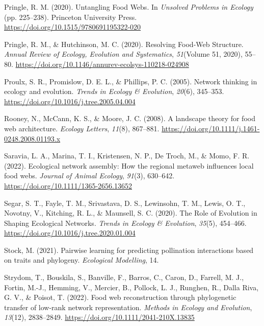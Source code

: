 \documentclass[
]{article}
\newlength{\cslhangindent}
\newenvironment{CSLReferences}[2] %
 {\begin{list}{}{%
  \setlength{\itemindent}{0pt}
  \setlength{\leftmargin}{0pt}
  \setlength{\parsep}{0pt}
  \ifodd #1
   \setlength{\leftmargin}{\cslhangindent}
   \setlength{\itemindent}{-1\cslhangindent}
  \fi
  \setlength{\itemsep}{#2\baselineskip}}}
 {\end{list}}
\begin{document}
\begin{CSLReferences}{1}{0}
Pringle, R. M. (2020). Untangling {Food Webs}. In \emph{Unsolved
{Problems} in {Ecology}} (pp. 225--238). Princeton University Press.
\url{https://doi.org/10.1515/9780691195322-020}

Pringle, R. M., \& Hutchinson, M. C. (2020). Resolving {Food-Web
Structure}. \emph{Annual Review of Ecology, Evolution and Systematics},
\emph{51}(Volume 51, 2020), 55--80.
\url{https://doi.org/10.1146/annurev-ecolsys-110218-024908}

Proulx, S. R., Promislow, D. E. L., \& Phillips, P. C. (2005). Network
thinking in ecology and evolution. \emph{Trends in Ecology \&
Evolution}, \emph{20}(6), 345--353.
\url{https://doi.org/10.1016/j.tree.2005.04.004}

Rooney, N., McCann, K. S., \& Moore, J. C. (2008). A landscape theory
for food web architecture. \emph{Ecology Letters}, \emph{11}(8),
867--881. \url{https://doi.org/10.1111/j.1461-0248.2008.01193.x}

Saravia, L. A., Marina, T. I., Kristensen, N. P., De Troch, M., \& Momo,
F. R. (2022). Ecological network assembly: {How} the regional metaweb
influences local food webs. \emph{Journal of Animal Ecology},
\emph{91}(3), 630--642. \url{https://doi.org/10.1111/1365-2656.13652}

Segar, S. T., Fayle, T. M., Srivastava, D. S., Lewinsohn, T. M., Lewis,
O. T., Novotny, V., Kitching, R. L., \& Maunsell, S. C. (2020). The
{Role} of {Evolution} in {Shaping Ecological Networks}. \emph{Trends in
Ecology \& Evolution}, \emph{35}(5), 454--466.
\url{https://doi.org/10.1016/j.tree.2020.01.004}

Stock, M. (2021). Pairwise learning for predicting pollination
interactions based on traits and phylogeny. \emph{Ecological Modelling},
14.

Strydom, T., Bouskila, S., Banville, F., Barros, C., Caron, D., Farrell,
M. J., Fortin, M.-J., Hemming, V., Mercier, B., Pollock, L. J., Runghen,
R., Dalla Riva, G. V., \& Poisot, T. (2022). Food web reconstruction
through phylogenetic transfer of low-rank network representation.
\emph{Methods in Ecology and Evolution}, \emph{13}(12), 2838--2849.
\url{https://doi.org/10.1111/2041-210X.13835}


\end{CSLReferences}
\end{document}

